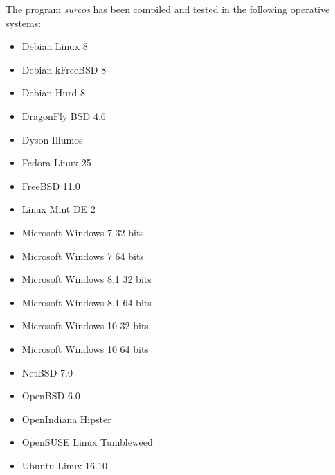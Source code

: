 The program \emph{surcos} has been compiled and tested in the following
operative systems:
\begin{itemize}
\item Debian Linux 8
\item Debian kFreeBSD 8
\item Debian Hurd 8
\item DragonFly BSD 4.6
\item Dyson Illumos
\item Fedora Linux 25
\item FreeBSD 11.0
\item Linux Mint DE 2
\item Microsoft Windows 7 32 bits
\item Microsoft Windows 7 64 bits
\item Microsoft Windows 8.1 32 bits
\item Microsoft Windows 8.1 64 bits
\item Microsoft Windows 10 32 bits
\item Microsoft Windows 10 64 bits
\item NetBSD 7.0
\item OpenBSD 6.0
\item OpenIndiana Hipster
\item OpenSUSE Linux Tumbleweed
\item Ubuntu Linux 16.10
\end{itemize}
